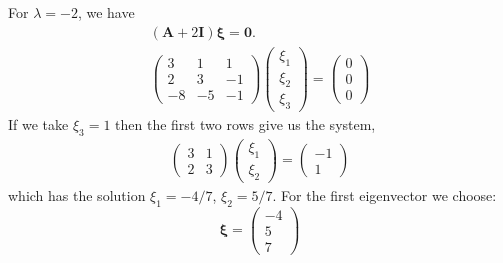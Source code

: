 {\begin{Solution}
\begin{enumerate}
    For $\lambda = -2$, we have
    \begin{gather*}
      ( \mathbf{A}  + 2 \mathbf{I} ) \boldsymbol{\xi} = \mathbf{0}. \\
      \begin{pmatrix}
        3 & 1 & 1 \\
        2 & 3 & -1 \\
        -8 & -5 & -1 
      \end{pmatrix}
      \begin{pmatrix}
        \xi_1 \\
        \xi_2 \\
        \xi_3
      \end{pmatrix}
      =
      \begin{pmatrix}
        0 \\
        0 \\
        0
      \end{pmatrix}
    \end{gather*}
    If we take $\xi_3 = 1$ then the first two rows give us the system,
    \begin{gather*}
      \begin{pmatrix}
        3 & 1 \\
        2 & 3 
      \end{pmatrix}
      \begin{pmatrix}
        \xi_1 \\
        \xi_2 
      \end{pmatrix}
      =
      \begin{pmatrix}
        -1 \\
        1 
      \end{pmatrix}
    \end{gather*}
    which has the solution $\xi_1 = -4/7$, $\xi_2 = 5/7$.  For the first 
    eigenvector we choose:
    \[
    \boldsymbol{\xi} = 
    \begin{pmatrix}
      -4 \\
      5 \\
      7
    \end{pmatrix}
    \]



\end{enumerate}
\end{Solution}}
